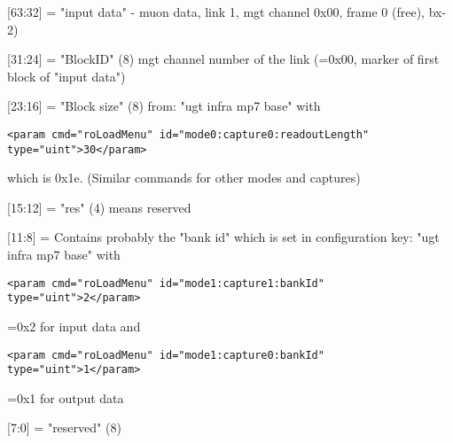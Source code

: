 
[63:32] = "input data" - muon data, link 1, mgt channel 0x00, frame 0 (free), bx-2)

[31:24] = "BlockID" (8) mgt channel number of the link (=0x00, marker of first block of "input data")

[23:16] = "Block size" (8) from: "ugt infra mp7 base" with

\texttt{\small{<param cmd="roLoadMenu" id="mode0:capture0:readoutLength" type="uint">30</param>}}

which is 0x1e. (Similar commands for other modes and captures)

[15:12] = "res" (4) means reserved

[11:8] = Contains probably the "bank id" which is set in configuration key: "ugt infra mp7 base" with

\texttt{\small{<param cmd="roLoadMenu" id="mode1:capture1:bankId" type="uint">2</param>}}

=0x2 for input data and

\texttt{\small{<param cmd="roLoadMenu" id="mode1:capture0:bankId" type="uint">1</param>}}

=0x1 for output data

[7:0] = "reserved" (8)\\

